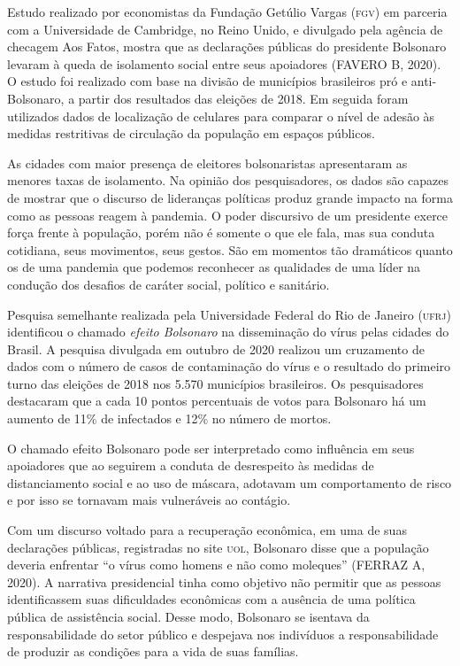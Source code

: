 Estudo realizado por economistas da Fundação Getúlio Vargas (\textsc{fgv}) em
parceria com a Universidade de Cambridge, no Reino Unido, e divulgado
pela agência de checagem Aos Fatos, mostra que as declarações públicas
do presidente Bolsonaro levaram à queda de isolamento social entre seus
apoiadores (FAVERO B, 2020). O estudo foi realizado com base na divisão
de municípios brasileiros pró e anti-Bolsonaro, a partir dos resultados
das eleições de 2018. Em seguida foram utilizados dados de localização
de celulares para comparar o nível de adesão às medidas restritivas de
circulação da população em espaços públicos.

As cidades com maior presença de eleitores bolsonaristas apresentaram as
menores taxas de isolamento. Na opinião dos pesquisadores, os dados são
capazes de mostrar que o discurso de lideranças políticas produz grande
impacto na forma como as pessoas reagem à pandemia. O poder discursivo
de um presidente exerce força frente à população, porém não é somente o
que ele fala, mas sua conduta cotidiana, seus movimentos, seus gestos.
São em momentos tão dramáticos quanto os de uma pandemia que podemos
reconhecer as qualidades de uma líder na condução dos desafios de
caráter social, político e sanitário.

Pesquisa semelhante realizada pela Universidade Federal do Rio de
Janeiro (\textsc{ufrj}) identificou o chamado \textit{efeito Bolsonaro} na
disseminação do vírus pelas cidades do Brasil. A pesquisa divulgada em
outubro de 2020 realizou um cruzamento de dados com o número de casos de
contaminação do vírus e o resultado do primeiro turno das eleições de 2018
nos 5.570 municípios brasileiros. Os pesquisadores destacaram que a cada
10 pontos percentuais de votos para Bolsonaro há um aumento de 11\% de
infectados e 12\% no número de mortos.

O chamado efeito Bolsonaro pode ser interpretado como influência em seus
apoiadores que ao seguirem a conduta de desrespeito às medidas de
distanciamento social e ao uso de máscara, adotavam um comportamento de
risco e por isso se tornavam mais vulneráveis ao contágio.

Com um discurso voltado para a recuperação econômica, em uma de suas
declarações públicas, registradas no site \textsc{uol}, Bolsonaro disse que a
população deveria enfrentar ``o vírus como homens e não como moleques''
(FERRAZ A, 2020). A narrativa presidencial tinha como objetivo não
permitir que as pessoas identificassem suas dificuldades econômicas com
a ausência de uma política pública de assistência social. Desse modo,
Bolsonaro se isentava da responsabilidade do setor público e despejava
nos indivíduos a responsabilidade de produzir as condições para a vida
de suas famílias.

